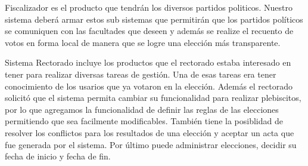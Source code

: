 Fiscalizador es el producto que tendrán los diversos partidos politicos. Nuestro sistema deberá armar estos sub sistemas que permitirán que los partidos políticos se comuniquen con las facultades que deseen y además se realize el recuento de votos en forma local de manera que se logre una elección más transparente. 
\\ \par
Sistema Rectorado incluye los productos que el rectorado estaba interesado en tener para realizar diversas tareas de gestión. Una de esas tareas era tener conocimiento de los usarios que ya votaron en la elección. Además el rectorado solicitó que el sistema permita cambiar su funcionalidad para realizar plebiscitos, por lo que agregamos la funcionalidad de definir las reglas de las elecciones permitiendo que sea facilmente modificables. También tiene la posiblidad de resolver los conflictos para los resultados de una elección y aceptar un acta que fue generada por el sistema. Por último puede administrar elecciones, decidir su fecha de inicio y fecha de fin.

